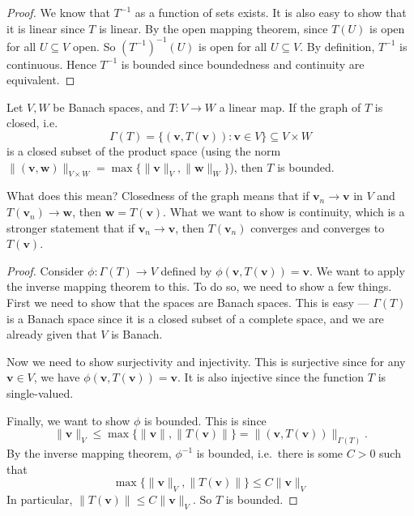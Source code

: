 \documentclass[a4paper]{article}
\begin{document}
\begin{proof}
  We know that $T^{-1}$ as a function of sets exists. It is also easy to show that it is linear since $T$ is linear. By the open mapping theorem, since $T(U)$ is open for all $U \subseteq V$ open. So $(T^{-1})^{-1}(U)$ is open for all $U\subseteq V$. By definition, $T^{-1}$ is continuous. Hence $T^{-1}$ is bounded since boundedness and continuity are equivalent.
\end{proof}

\begin{thm}
  Let $V, W$ be Banach spaces, and $T: V\to W$ a linear map. If the graph of $T$ is closed, i.e.
  \[
    \Gamma(T) = \{(\mathbf{v}, T(\mathbf{v})): \mathbf{v}\in V\} \subseteq V\times W
  \]
  is a closed subset of the product space (using the norm $\|(\mathbf{v}, \mathbf{w})\|_{V\times W} = \max \{\|\mathbf{v}\|_V, \|\mathbf{w}\|_W\}$), then $T$ is bounded.
\end{thm}
What does this mean? Closedness of the graph means that if $\mathbf{v}_n \to \mathbf{v}$ in $V$ and $T (\mathbf{v}_n) \to \mathbf{w}$, then $\mathbf{w} = T(\mathbf{v})$. What we want to show is continuity, which is a stronger statement that if $\mathbf{v}_n \to \mathbf{v}$, then $T(\mathbf{v}_n)$ converges and converges to $T(\mathbf{v})$.

\begin{proof}
  Consider $\phi: \Gamma(T) \to V$ defined by $\phi(\mathbf{v}, T(\mathbf{v})) = \mathbf{v}$. We want to apply the inverse mapping theorem to this. To do so, we need to show a few things. First we need to show that the spaces are Banach spaces. This is easy --- $\Gamma(T)$ is a Banach space since it is a closed subset of a complete space, and we are already given that $V$ is Banach.

  Now we need to show surjectivity and injectivity. This is surjective since for any $\mathbf{v}\in V$, we have $\phi(\mathbf{v}, T(\mathbf{v})) = \mathbf{v}$. It is also injective since the function $T$ is single-valued.

  Finally, we want to show $\phi$ is bounded. This is since
  \[
    \|\mathbf{v}\|_V \leq \max\{\|\mathbf{v}\|, \|T(\mathbf{v})\|\} = \|(\mathbf{v}, T(\mathbf{v}))\|_{\Gamma(T)}.
  \]
  By the inverse mapping theorem, $\phi^{-1}$ is bounded, i.e.\ there is some $C > 0$ such that
  \[
    \max\{\|\mathbf{v}\|_V, \|T(\mathbf{v})\|\} \leq C\|\mathbf{v}\|_V
  \]
  In particular, $\|T(\mathbf{v})\| \leq C\|\mathbf{v}\|_V$. So $T$ is bounded.
\end{proof}
\end{document}
